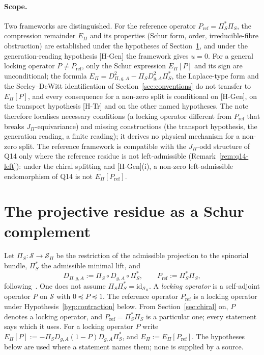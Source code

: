 \documentclass[11pt]{article}
\theoremstyle{definition}
\newcommand{\EPi}{E_\Pi}
\newcommand{\PiS}{\Pi_S}
\begin{document}
    \paragraph{Scope.}
    Two frameworks are distinguished.
    For the reference operator $P_{\mathrm{ref}}=\PiS^{*}\PiS$, the compression remainder $\EPi$ and its properties
      (Schur
    form, order, irreducible-fibre obstruction) are established under the hypotheses of Section~\ref{sec:schur}, and
      under
    the generation-reading hypothesis [H-Gen] the framework gives $u=0$.
    For a general locking operator $P\neq P_{\mathrm{ref}}$, only the Schur expression $\EPi[P]$ and its sign are
    unconditional; the formula $\EPi=D^2_{\Pi,g,A}-\PiS D_{g,A}^2\PiS^{*}$, the Laplace-type form and the
    Seeley--DeWitt identification of Section~\ref{sec:conventions} do not transfer to $\EPi[P]$, and every consequence
      for
    a non-zero split is conditional on [H-Gen], on the transport hypothesis [H-Tr] and on the other named hypotheses.
    The note therefore localises necessary conditions (a locking operator different from $P_{\mathrm{ref}}$ that breaks
    $J_\Pi$-equivariance) and missing constructions (the transport hypothesis, the generation reading, a finite
    reading); it derives no physical mechanism for a non-zero split.
    The reference framework is compatible with the $J_\Pi$-odd structure of Q14 only where the
    reference residue is not left-admissible (Remark~\ref{rem:q14-left}): under the chiral splitting and [H-Gen](i), a
    non-zero left-admissible endomorphism of Q14 is not $\EPi[P_{\mathrm{ref}}]$.

  \section{The projective residue as a Schur complement}
    \label{sec:schur}

    Let $\PiS:\mathcal S\to\mathcal S_\Pi$ be the restriction of the admissible projection to the
    spinorial bundle, $\PiS^{*}$ the admissible minimal lift, and
    \begin{equation}
      \label{eq:dpidef}
      D_{\Pi,g,A}:=\PiS\circ D_{g,A}\circ \PiS^{*},\qquad P_{\mathrm{ref}}:=\PiS^{*}\PiS,
    \end{equation}
    following~\cite{Beau2026q14}.
    One does not assume $\PiS\PiS^{*}=\mathrm{id}_{\mathcal S_\Pi}$.
    A \emph{locking operator} is a self-adjoint operator $P$ on $\mathcal S$ with $0\preceq P\preceq1$.
    The reference operator $P_{\mathrm{ref}}$ is a locking operator under Hypothesis~\ref{hyp:contraction} below.
    From Section~\ref{sec:chiral} on, $P$ denotes a locking operator, and $P_{\mathrm{ref}}=\PiS^{*}\PiS$ is a
      particular
    one; every statement says which it uses.
    For a locking operator $P$ write
    $\EPi[P]:=-\PiS D_{g,A}(1-P)D_{g,A}\PiS^{*}$, and $\EPi:=\EPi[P_{\mathrm{ref}}]$.
    The hypotheses below are used where a statement names them; none is supplied by a source.
\end{document}
